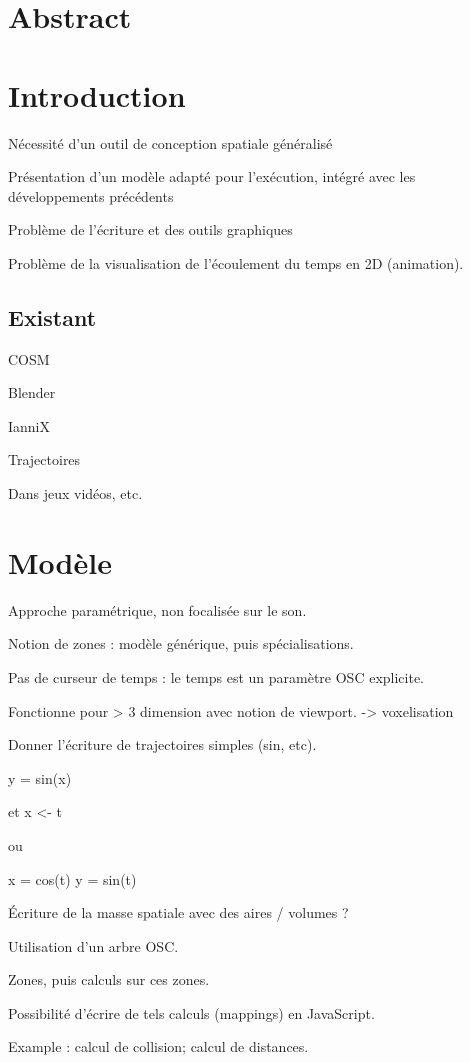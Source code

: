 \documentclass[french]{article}
\begin{document}
\section*{Abstract}
\section{Introduction}
Nécessité d'un outil de conception spatiale généralisé

Présentation d'un modèle adapté pour l'exécution, intégré avec les développements précédents

Problème de l'écriture et des outils graphiques

Problème de la visualisation de l'écoulement du temps en 2D (animation).

\subsection{Existant}

COSM

Blender

IanniX

Trajectoires

Dans jeux vidéos, etc.

\section{Modèle}
Approche paramétrique, non focalisée sur le son.

Notion de zones : modèle générique, puis spécialisations.

Pas de curseur de temps : le temps est un paramètre OSC explicite.

Fonctionne pour > 3 dimension avec notion de viewport.
-> voxelisation

Donner l'écriture de trajectoires simples (sin, etc).

y = sin(x)

et x <- t

ou

x = cos(t)
y = sin(t)

Écriture de la masse spatiale avec des aires / volumes ?

Utilisation d'un arbre OSC.

Zones, puis calculs sur ces zones. 

Possibilité d'écrire de tels calculs (mappings) en JavaScript.

Example : calcul de collision; calcul de distances.
\end{document}
